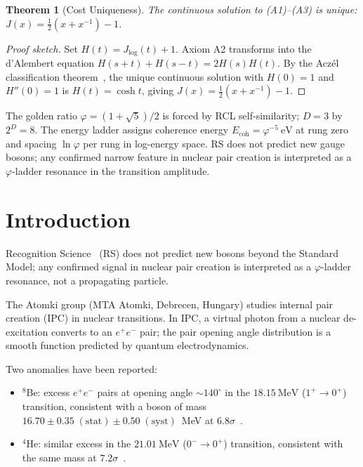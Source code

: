\documentclass[12pt,a4paper]{article}
\newtheorem{theorem}{Theorem}[section]
\theoremstyle{definition}
\theoremstyle{remark}
\begin{document}
\begin{theorem}[Cost Uniqueness]
\label{thm:unique}
The continuous solution to \textup{(A1)--(A3)} is unique:
$J(x) = \tfrac{1}{2}(x + x^{-1}) - 1$.
\end{theorem}

\begin{proof}[Proof sketch]
Set $H(t) = J_{\log}(t)+1$.  Axiom A2 transforms into the d'Alembert
equation $H(s+t)+H(s-t)=2H(s)H(t)$.  By the Acz\'el classification
theorem~\cite{Aczel1966}, the unique continuous solution with $H(0)=1$
and $H''(0)=1$ is $H(t)=\cosh t$, giving
$J(x)=\tfrac{1}{2}(x+x^{-1})-1$.
\end{proof}

\noindent The golden ratio $\varphi=(1+\sqrt{5})/2$ is forced by RCL
self-similarity; $D=3$ by $2^D=8$.  The energy ladder assigns coherence
energy $E_{\mathrm{coh}} = \varphi^{-5}~\mathrm{eV}$ at rung zero and
spacing $\ln\varphi$ per rung in log-energy space.  RS does not predict
new gauge bosons; any confirmed narrow feature in nuclear pair creation
is interpreted as a $\varphi$-ladder resonance in the transition amplitude.

\section{Introduction}
\label{sec:intro}

Recognition Science~\cite{RS_Axioms} (RS) does not predict new bosons
beyond the Standard Model; any confirmed signal in nuclear pair creation
is interpreted as a $\varphi$-ladder resonance, not a propagating particle.

The Atomki group (MTA Atomki, Debrecen, Hungary) studies internal pair
creation (IPC) in nuclear transitions.  In IPC, a virtual photon from
a nuclear de-excitation converts to an $e^+e^-$ pair; the pair opening
angle distribution is a smooth function predicted by quantum
electrodynamics.

Two anomalies have been reported:
\begin{itemize}[nosep]
  \item ${}^8$Be: excess $e^+e^-$ pairs at opening angle
  $\sim 140^\circ$ in the $18.15~\mathrm{MeV}$ ($1^+ \to 0^+$)
  transition, consistent with a boson of mass
  $16.70 \pm 0.35\;\mathrm{(stat)} \pm 0.50\;\mathrm{(syst)}$~MeV
  at $6.8\sigma$~\cite{Atomki2016}.
  \item ${}^4$He: similar excess in the $21.01~\mathrm{MeV}$ ($0^- \to
  0^+$) transition, consistent with the same mass at
  $7.2\sigma$~\cite{Atomki2019}.
\end{itemize}
\end{document}
